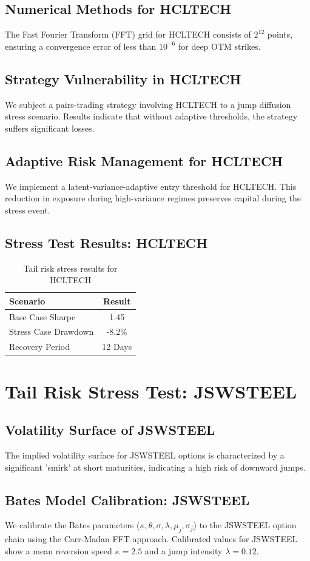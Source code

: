 \documentclass[12pt,a4paper,twoside]{article}
\begin{document}
\subsection{Numerical Methods for HCLTECH}
The Fast Fourier Transform (FFT) grid for HCLTECH consists of $2^{12}$ points, ensuring a convergence error of less than $10^{-6}$ for deep OTM strikes.
\subsection{Strategy Vulnerability in HCLTECH}
We subject a pairs-trading strategy involving HCLTECH to a jump diffusion stress scenario. Results indicate that without adaptive thresholds, the strategy suffers significant losses.
\subsection{Adaptive Risk Management for HCLTECH}
We implement a latent-variance-adaptive entry threshold for HCLTECH. This reduction in exposure during high-variance regimes preserves capital during the stress event.
\subsection{Stress Test Results: HCLTECH}
\begin{table}[H]
\centering
\begin{tabular}{|l|c|}
\hline
Scenario & Result \\
\hline
Base Case Sharpe & 1.45 \\
Stress Case Drawdown & -8.2\% \\
Recovery Period & 12 Days \\
\hline
\end{tabular}
\caption{Tail risk stress results for HCLTECH}
\end{table}
\newpage

\section{Tail Risk Stress Test: JSWSTEEL}
\subsection{Volatility Surface of JSWSTEEL}
The implied volatility surface for JSWSTEEL options is characterized by a significant 'smirk' at short maturities, indicating a high risk of downward jumps.
\subsection{Bates Model Calibration: JSWSTEEL}
We calibrate the Bates parameters ($\kappa, \theta, \sigma, \lambda, \mu_j, \sigma_j$) to the JSWSTEEL option chain using the Carr-Madan FFT approach.
Calibrated values for JSWSTEEL show a mean reversion speed $\kappa = 2.5$ and a jump intensity $\lambda = 0.12$.
\end{document}
